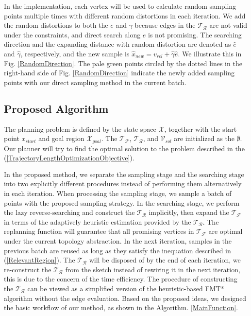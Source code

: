 In the implementation, each vertex will be used to calculate random sampling points multiple times with different random distortions in each iteration.
We add the random distortions to both the $e$ and $\gamma$ because edges in the $\mathcal{T}_{\mathcal{R}}$ are not valid under the constraints, and direct search along $e$ is not promising.
The searching direction and the expanding distance with random distortion are denoted as $\hat{e}$ and $\hat{\gamma}$, respectively, and the new sample is $\hat{x}_{new} = v_{rel} + \hat{\gamma}\hat{e}$.
We illustrate this in Fig. \ref{RandomDirection}.
The pale green points circled by the dotted lines in the right-hand side of Fig. \ref{RandomDirection} indicate the newly added sampling points with our direct sampling method in the current batch. 

\subsection{Proposed Algorithm}



The planning problem is defined by the state space $\mathcal{X}$, together with the start point $x_{start}$ and goal region $\mathcal{X}_{goal}$. 
The $\mathcal{T}_{\mathcal{F}}$, $\mathcal{T}_{\mathcal{R}}$, and $\mathcal{V}_{sol}$ are initialized as the $\emptyset$.
Our planner will try to find the optimal solution to the problem described in the (\ref{TrajectoryLengthOptimizationObjective}).


In the proposed method, we separate the sampling stage and the searching stage into two explicitly different procedures instead of performing them alternatively in each iteration. 
When processing the sampling stage, we sample a batch of points with the proposed sampling strategy.
In the searching stage, we perform the lazy reverse-searching and construct the $\mathcal{T}_{\mathcal{R}}$ implicitly, then expand the $\mathcal{T}_{\mathcal{F}}$ in terms of the adaptively heuristic estimation provided by the $\mathcal{T}_{\mathcal{R}}$. 
The replanning function will guarantee that all promising vertices in $\mathcal{T}_{\mathcal{F}}$ are optimal under the current topology abstraction. 
In the next iteration, samples in the previous batch are reused as long as they satisfy the inequation described in (\ref{RelevantRegion}).
The $\mathcal{T}_{\mathcal{R}}$ will be disposed of by the end of each iteration, we re-construct the $\mathcal{T}_{\mathcal{R}}$ from the sketch instead of rewiring it in the next iteration, this is due to the concern of the time efficiency.
The procedure of constructing the $\mathcal{T}_{\mathcal{R}}$ can be viewed as a simplified version of the heuristic-based FMT* algorithm without the edge evaluation.
Based on the proposed ideas, we designed the basic workflow of our method, as shown in the Algorithm. \ref{MainFunction}.




